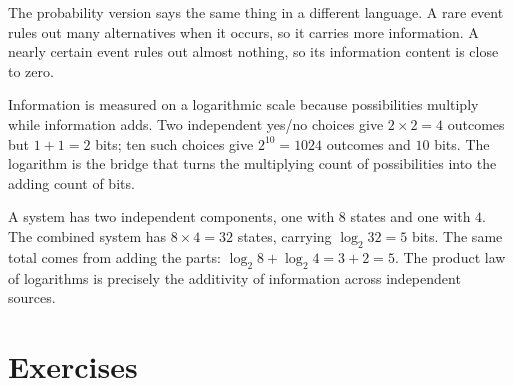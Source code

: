 \documentclass[12pt]{book}
\begin{document}
The probability version says the same thing in a different language. A rare event rules
out many alternatives when it occurs, so it carries more information. A nearly certain
event rules out almost nothing, so its information content is close to zero.

\begin{visual}
Information is measured on a logarithmic scale because possibilities multiply while
information adds. Two independent yes/no choices give $2\times2=4$ outcomes but
$1+1=2$ bits; ten such choices give $2^{10}=1024$ outcomes and $10$ bits. The
logarithm is the bridge that turns the multiplying count of possibilities into the
adding count of bits.
\end{visual}

\begin{example}
A system has two independent components, one with $8$ states and one with $4$. The
combined system has $8\times4=32$ states, carrying $\log_2 32=5$ bits. The same total
comes from adding the parts: $\log_2 8+\log_2 4=3+2=5$. The product law of logarithms
is precisely the additivity of information across independent sources.
\end{example}

\section{Exercises}
\end{document}
